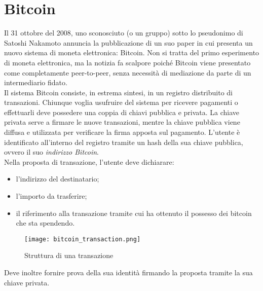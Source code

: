 \section{Bitcoin}
	Il 31 ottobre del 2008, uno sconosciuto (o un gruppo) sotto lo pseudonimo di Satoshi Nakamoto annuncia la pubblicazione di un suo paper \cite{nakamoto_bitcoin} in cui presenta un nuovo sistema di moneta elettronica: Bitcoin. Non si tratta del primo esperimento di moneta elettronica, ma la notizia fa scalpore poiché Bitcoin viene presentato come completamente peer-to-peer, senza necessità di mediazione da parte di un intermediario fidato. \\
	Il sistema Bitcoin consiste, in estrema sintesi, in un registro distribuito di transazioni. Chiunque voglia usufruire del sistema per ricevere pagamenti o effettuarli deve possedere una coppia di chiavi pubblica e privata. La chiave privata serve a firmare le nuove transazioni, mentre la chiave pubblica viene diffusa e utilizzata per verificare la firma apposta sul pagamento. L'utente è identificato all'interno del registro tramite un hash della sua chiave pubblica, ovvero il suo \emph{indirizzo Bitcoin}. \\
	Nella proposta di transazione, l'utente deve dichiarare:
	\begin{itemize}
		\item l'indirizzo del destinatario;
		\item l'importo da trasferire;
		\item il riferimento alla transazione tramite cui ha ottenuto il possesso dei bitcoin che sta spendendo.
	\end{itemize}
	\begin{figure}[ht]
		\centering
		\texttt{[image: bitcoin\_transaction.png]}
		\caption{Struttura di una transazione}
		\label{fig:bitcoin_transaction}
	\end{figure}
	Deve inoltre fornire prova della sua identità firmando la proposta tramite la sua chiave privata.
